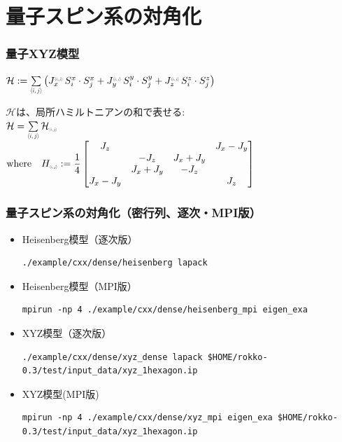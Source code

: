 \section{量子スピン系の対角化}

\begin{frame}[c,fragile]
  \frametitle{量子XYZ模型}
\setlength{\fboxsep}{1pt}

\noindent
$\mathcal{H}
 := \sum\limits_{\middlescr{{\langle i,j \rangle}}} \left(
  J_x^{\smallscr{\langle i,j \rangle}} \, S^x_i \cdot S^x_j
+ J_y^{\smallscr{\langle i,j \rangle}} \, S^y_i \cdot S^y_j
+ J_z^{\smallscr{\langle i,j \rangle}} \, S^z_i \cdot S^z_j
\right)$

\vspace{1\baselineskip}

\noindent
$\mathcal{H}$は、局所ハミルトニアンの和で表せる:\\
\noindent
$\mathcal{H} =
\sum\limits_{\middlescr{\langle i,j \rangle}}  \mathcal{H}_{\smallscr{\langle i,j \rangle}}$ \\
$\text{where} \quad  H_{\smallscr{\langle i,j \rangle}} :=
\dfrac{1}{4}
\begin{bmatrix}
J_z & & & J_x-J_y \\
 & - J_z & J_x+J_y & \\
 & J_x+J_y & - J_z & \\
J_x-J_y & & & J_z
\end{bmatrix}$

\end{frame}

\begin{frame}[c,fragile]
  \frametitle{量子スピン系の対角化（密行列、逐次・MPI版）}
  \begin{itemize}
  \item Heisenberg模型（逐次版） 
\begin{lstlisting}[style=shstyle]
./example/cxx/dense/heisenberg lapack
\end{lstlisting}
  \item Heisenberg模型（MPI版） 
\begin{lstlisting}[style=shstyle]
mpirun -np 4 ./example/cxx/dense/heisenberg_mpi eigen_exa
\end{lstlisting}
  \item XYZ模型（逐次版） 
\begin{lstlisting}[style=shstyle]
./example/cxx/dense/xyz_dense lapack $HOME/rokko-0.3/test/input_data/xyz_1hexagon.ip
\end{lstlisting}
  \item XYZ模型(MPI版) 
\begin{lstlisting}[style=shstyle]
mpirun -np 4 ./example/cxx/dense/xyz_mpi eigen_exa $HOME/rokko-0.3/test/input_data/xyz_1hexagon.ip
\end{lstlisting}
  \end{itemize}
\end{frame}

